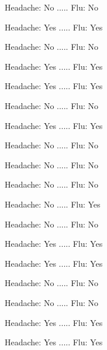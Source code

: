 \documentclass{article}\usepackage{graphicx, color}
\begin{document}
\begin{multicols}{3}
\bigskip
\bigskip

\noindent Headache: No .....      Flu: No

\bigskip
\bigskip

\noindent Headache: Yes .....      Flu: Yes

\bigskip
\bigskip

\noindent Headache: No .....      Flu: No

\bigskip
\bigskip

\noindent Headache: Yes .....      Flu: Yes

\bigskip
\bigskip

\noindent Headache: Yes .....      Flu: Yes

\bigskip
\bigskip

\noindent Headache: No .....      Flu: No

\bigskip
\bigskip

\noindent Headache: Yes .....      Flu: Yes

\bigskip
\bigskip

\noindent Headache: No .....      Flu: No

\bigskip
\bigskip

\noindent Headache: No .....      Flu: No

\bigskip
\bigskip

\noindent Headache: No .....      Flu: No

\bigskip
\bigskip

\noindent Headache: No .....      Flu: Yes

\bigskip
\bigskip

\noindent Headache: No .....      Flu: No

\bigskip
\bigskip

\noindent Headache: Yes .....      Flu: Yes

\bigskip
\bigskip

\noindent Headache: Yes .....      Flu: Yes

\bigskip
\bigskip

\noindent Headache: No .....      Flu: No

\bigskip
\bigskip

\noindent Headache: No .....      Flu: No

\bigskip
\bigskip

\noindent Headache: Yes .....      Flu: Yes

\bigskip
\bigskip

\noindent Headache: Yes .....      Flu: Yes

\bigskip
\bigskip


\end{multicols}
\end{document}
